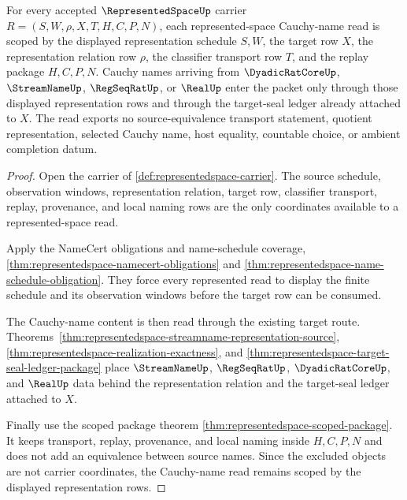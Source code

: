 \begin{theorem}
\label{thm:represented-space-cauchy-name-scope-package}
For every accepted $\RepresentedSpaceUp$ carrier $R=(S,W,\rho,X,T,H,C,P,N)$, each represented-space Cauchy-name read is scoped by the displayed representation schedule $S,W$, the target row $X$, the representation relation row $\rho$, the classifier transport row $T$, and the replay package $H,C,P,N$. Cauchy names arriving from $\DyadicRatCoreUp$, $\StreamNameUp$, $\RegSeqRatUp$, or $\RealUp$ enter the packet only through those displayed representation rows and through the target-seal ledger already attached to $X$. The read exports no source-equivalence transport statement, quotient representation, selected Cauchy name, host equality, countable choice, or ambient completion datum.
\end{theorem}
\begin{proof}
Open the carrier of \autoref{def:representedspace-carrier}. The source schedule, observation windows, representation relation, target row, classifier transport, replay, provenance, and local naming rows are the only coordinates available to a represented-space read.

Apply the NameCert obligations and name-schedule coverage, \autoref{thm:representedspace-namecert-obligations} and \autoref{thm:representedspace-name-schedule-obligation}. They force every represented read to display the finite schedule and its observation windows before the target row can be consumed.

The Cauchy-name content is then read through the existing target route. Theorems~\ref{thm:representedspace-streamname-representation-source}, \ref{thm:representedspace-realization-exactness}, and \ref{thm:representedspace-target-seal-ledger-package} place $\StreamNameUp$, $\RegSeqRatUp$, $\DyadicRatCoreUp$, and $\RealUp$ data behind the representation relation and the target-seal ledger attached to $X$.

Finally use the scoped package theorem \autoref{thm:representedspace-scoped-package}. It keeps transport, replay, provenance, and local naming inside $H,C,P,N$ and does not add an equivalence between source names. Since the excluded objects are not carrier coordinates, the Cauchy-name read remains scoped by the displayed representation rows.
\end{proof}

